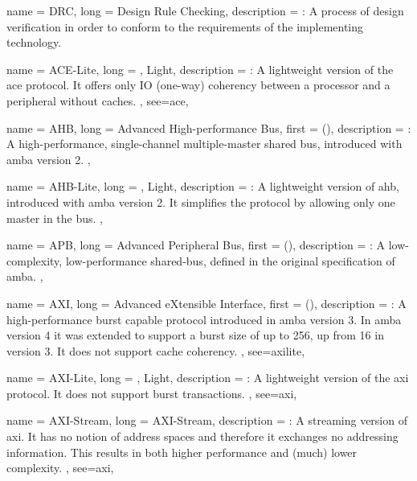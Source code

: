 {
	name = {DRC},
	long = {Design Rule Checking},
	description = {\emph{}:
		A process of design verification in order to conform to the requirements
		of the implementing technology.
	}
}

{
	name = {ACE-Lite},
	long = {, Light},
	description = {\emph{}:
		A lightweight version of the \gls{ace} protocol. It offers only IO (one-way) coherency
		between a processor and a peripheral without caches.
	},
	see={ace},
}


{
	name = {AHB},
	long = {Advanced High-performance Bus},
	first = { ()},
	description = {\emph{}:
		A high-performance, single-channel multiple-master shared bus, 
		introduced with \gls{amba} version 2.
	},
}


{
	name = {AHB-Lite},
	long = {, Light},
	description = {\emph{}:
		A lightweight version of \gls{ahb}, introduced with \gls{amba} version 2.
		It simplifies the protocol by allowing only one master in the bus.
	},
}


{
	name = {APB},
	long = {Advanced Peripheral Bus},
	first = { ()},
	description = {\emph{}:
		A low-complexity, low-performance shared-bus, defined in the original
		specification of \gls{amba}.
	},
}


{
	name = {AXI},
	long = {Advanced eXtensible Interface},
	first = { ()},
	description = {\emph{}:
		A high-performance \gls{burst} capable protocol introduced in \gls{amba} version 3.
		In \gls{amba} version 4 it was extended to support a \gls{burst} size of up to 256,
		up from 16 in version 3. It does not support cache coherency.
	},
	see={axilite},
}


{
	name = {AXI-Lite},
	long = {, Light},
	description = {\emph{}:
		A lightweight version of the \gls{axi} protocol. 
		It does not support \gls{burst} transactions.
	},
	see={axi},
}

{
	name = {AXI-Stream},
	long = {AXI-Stream},
	description = {\emph{}:
		A streaming version of \gls{axi}. It has no notion of address spaces
		and therefore it exchanges no addressing information. 
		This results in both higher performance and (much) lower complexity.
	},
	see={axi},
}



